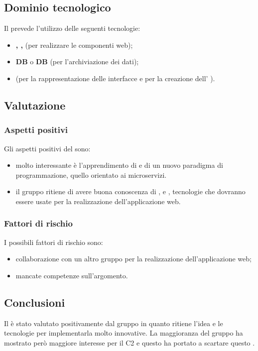 	\subsection {Dominio tecnologico}
		Il  prevede l'utilizzo delle seguenti tecnologie:
		\begin {itemize}
			\item \textbf{, , } (per realizzare le componenti web);
			\item \textbf{DB } o \textbf{DB } (per l'archiviazione dei dati);
			\item \textbf{} (per la rappresentazione delle interfacce e per la creazione dell' ).
		\end {itemize}
	\subsection {Valutazione}
		\subsubsection {Aspetti positivi}
		Gli aspetti positivi del  sono:
			\begin{itemize}
				\item molto interessante è l'apprendimento di  e di un nuovo paradigma di programmazione, quello orientato ai microservizi.
				\item il gruppo ritiene di avere buona conoscenza di ,  e , tecnologie che dovranno essere usate per la realizzazione dell'applicazione web.
			\end{itemize}
		\subsubsection {Fattori di rischio}
		I possibili fattori di rischio sono:
			\begin{itemize}
				\item collaborazione con un altro gruppo per la realizzazione dell'applicazione web;
				\item mancate competenze sull'argomento.
			\end{itemize}
	\subsection {Conclusioni}
		Il  è stato valutato positivamente dal gruppo in quanto ritiene l'idea e le tecnologie per implementarla molto innovative. La maggioranza del gruppo ha mostrato però maggiore interesse
		per il  C2 e questo ha portato a scartare questo .
